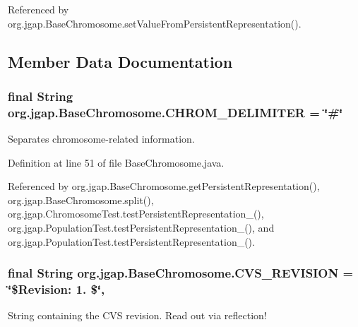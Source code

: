 Referenced by org.\-jgap.\-Base\-Chromosome.\-set\-Value\-From\-Persistent\-Representation().



\subsection{Member Data Documentation}
\hypertarget{classorg_1_1jgap_1_1_base_chromosome_a4efa73cb7ff2c5dcd0e16f1d7287dc78}{
\subsubsection[{C\-H\-R\-O\-M\-\_\-\-D\-E\-L\-I\-M\-I\-T\-E\-R}]{\setlength{\rightskip}{0pt plus 5cm}final String org.\-jgap.\-Base\-Chromosome.\-C\-H\-R\-O\-M\-\_\-\-D\-E\-L\-I\-M\-I\-T\-E\-R = \char`\"{}\#\char`\"{}\hspace{0.3cm}{\ttfamily [static]}}}\label{classorg_1_1jgap_1_1_base_chromosome_a4efa73cb7ff2c5dcd0e16f1d7287dc78}
Separates chromosome-\/related information. 

Definition at line 51 of file Base\-Chromosome.\-java.



Referenced by org.\-jgap.\-Base\-Chromosome.\-get\-Persistent\-Representation(), org.\-jgap.\-Base\-Chromosome.\-split(), org.\-jgap.\-Chromosome\-Test.\-test\-Persistent\-Representation\-\_(), org.\-jgap.\-Population\-Test.\-test\-Persistent\-Representation\-\_(), and org.\-jgap.\-Population\-Test.\-test\-Persistent\-Representation\-\_().

\hypertarget{classorg_1_1jgap_1_1_base_chromosome_a1d84ed799a8428ca04fdd53a59e68df0}{
\subsubsection[{C\-V\-S\-\_\-\-R\-E\-V\-I\-S\-I\-O\-N}]{\setlength{\rightskip}{0pt plus 5cm}final String org.\-jgap.\-Base\-Chromosome.\-C\-V\-S\-\_\-\-R\-E\-V\-I\-S\-I\-O\-N = \char`\"{}\$Revision\-: 1. \$\char`\"{}\hspace{0.3cm}{\ttfamily [static]}, {\ttfamily [private]}}}\label{classorg_1_1jgap_1_1_base_chromosome_a1d84ed799a8428ca04fdd53a59e68df0}
String containing the C\-V\-S revision. Read out via reflection! 

